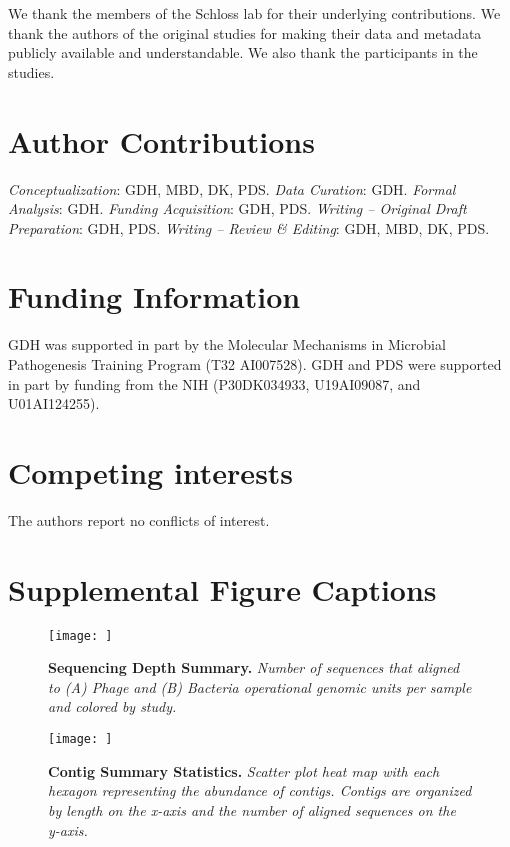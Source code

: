 \documentclass[12pt,]{article}
\newcommand{\beginsupplement}{%
        \setcounter{table}{0}
        \renewcommand{\thetable}{S\arabic{table}}%
        \setcounter{figure}{0}
        \renewcommand{\thefigure}{S\arabic{figure}}%
     }
\begin{document}
We thank the members of the Schloss lab for their underlying
contributions. We thank the authors of the original studies for making
their data and metadata publicly available and understandable. We also
thank the participants in the studies.

\section{Author Contributions}\label{author-contributions}

\emph{Conceptualization}: GDH, MBD, DK, PDS. \emph{Data Curation}: GDH.
\emph{Formal Analysis}: GDH. \emph{Funding Acquisition}: GDH, PDS.
\emph{Writing -- Original Draft Preparation}: GDH, PDS. \emph{Writing --
Review \& Editing}: GDH, MBD, DK, PDS.

\section{Funding Information}\label{funding-information}

GDH was supported in part by the Molecular Mechanisms in Microbial
Pathogenesis Training Program (T32 AI007528). GDH and PDS were supported
in part by funding from the NIH (P30DK034933, U19AI09087, and
U01AI124255).

\section{Competing interests}\label{competing-interests}

The authors report no conflicts of interest.

\newpage

\section{Supplemental Figure
Captions}\label{supplemental-figure-captions}

\beginsupplement

\begin{figure}[htbp]
\centering
\texttt{[image: ]}
\caption{\textbf{Sequencing Depth Summary.} \emph{Number of sequences
that aligned to (A) Phage and (B) Bacteria operational genomic units per
sample and colored by study.}\label{SequenceStats}}
\end{figure}

\newpage

\begin{figure}[htbp]
\centering
\texttt{[image: ]}
\caption{\textbf{Contig Summary Statistics.} \emph{Scatter plot heat map
with each hexagon representing the abundance of contigs. Contigs are
organized by length on the x-axis and the number of aligned sequences on
the y-axis.}\label{ContigStats}}
\end{figure}
\end{document}
